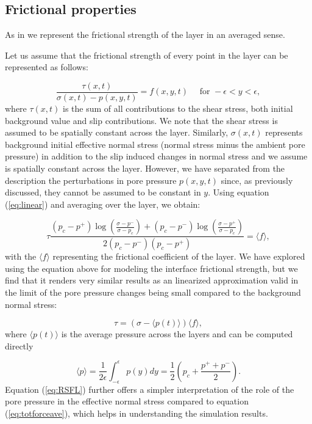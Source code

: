 \documentclass[draft]{agujournal2019}
\begin{document}
\subsection{Frictional properties}

As in  we represent the frictional strength of the layer in an averaged sense.

Let us assume that the frictional strength of every point in the layer can be represented as follows:

\begin{equation}
\frac{\tau(x,t)}{\sigma(x,t) - p(x,y,t)} = f(x,y,t) \quad \text{ for } -\epsilon < y < \epsilon,
\label{eq:totforce}    
\end{equation}
where $\tau(x,t)$ is the sum of all contributions to the shear stress, both initial background value and slip contributions. We note that the shear stress is assumed to be spatially constant across the layer. Similarly, $\sigma(x,t)$ represents background initial effective normal stress (normal stress minus the ambient pore pressure) in addition to the slip induced changes in normal stress and we assume is spatially constant across the layer. However, we have separated from the description the perturbations in pore pressure $p(x,y,t)$ since, as previously discussed, they cannot be assumed to be constant in $y$. Using equation (\ref{eq:linear}) and averaging over the layer, we obtain:

\begin{equation}
\tau \frac{ ( p_c - p^+ ) \log \left( \frac{\sigma - p^-}{\sigma - p_c} \right) +  (p_c - p^- ) \log \left( \frac{\sigma - p^+}{\sigma - p_c} \right) }{2 (p_c - p^-) (p_c - p^+)} = \langle f \rangle ,
\label{eq:totforceave}    
\end{equation}
with the $\langle f \rangle$ representing the frictional coefficient of the layer. We have explored using the equation above for modeling the interface frictional strength, but we find that it renders very similar results as an linearized approximation valid in the limit of the pore pressure changes being small compared to the background normal stress:

\begin{equation}
  \tau = ({\sigma}- \langle p(t) \rangle  ) \langle f \rangle,
    \label{eq:RSFL}
\end{equation}
where $\langle p(t) \rangle$ is the average pressure across the layers and can be computed directly

\begin{equation}
    \langle p \rangle = \frac{1}{2 \epsilon} \int_{-\epsilon}^{\epsilon} p(y) dy = \frac{1}{2} \left( p_c  + \frac{p^+ + p^-}{2} \right).
    \label{eq:avep}
\end{equation}
Equation (\ref{eq:RSFL}) further offers a simpler interpretation of the role of the pore pressure in the effective normal stress compared to equation (\ref{eq:totforceave}), which helps in understanding the simulation results.
\end{document}
